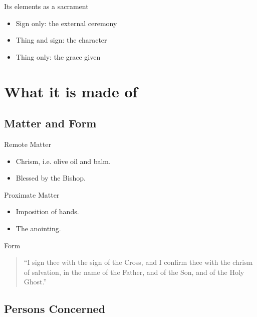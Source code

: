 \documentclass{beamer}
\begin{document}
\begin{frame}{Its elements as a sacrament}

\begin{itemize}
\item Sign only: the external ceremony
\item Thing and sign: the character
\item Thing only: the grace given
\end{itemize}

\end{frame}

\section{What it is made of}

\subsection{Matter and Form}

\begin{frame}{Remote Matter}

\begin{itemize}
\item Chrism, i.e. olive oil and balm.
\item Blessed by the Bishop.
\end{itemize}

\end{frame}

\begin{frame}{Proximate Matter}
\begin{itemize}
\item Imposition of hands.
\item The anointing.
\end{itemize}
\end{frame}

\begin{frame}{Form}
\begin{quote}
``I sign thee with the sign of the Cross, and I confirm thee with the chrism of salvation, in the name of the Father, and of the Son, and of the Holy Ghost.''
\end{quote}
\end{frame}

\subsection{Persons Concerned}
\end{document}
